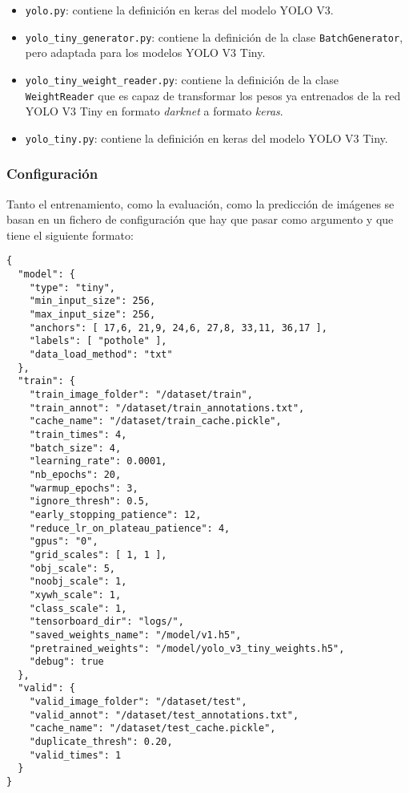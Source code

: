 \begin{itemize}
	\item \texttt{yolo.py}:  contiene la definición en keras del modelo YOLO V3.
	\item \texttt{yolo\_tiny\_generator.py}: contiene la definición de la clase \texttt{BatchGenerator}, pero adaptada para los modelos YOLO V3 Tiny.
	\item \texttt{yolo\_tiny\_weight\_reader.py}: contiene la definición de la clase \texttt{WeightReader}  que es capaz de transformar los pesos ya entrenados de la red YOLO V3 Tiny en formato \textit{darknet} a formato \textit{keras}.
	\item \texttt{yolo\_tiny.py}: contiene la definición en keras del modelo YOLO V3 Tiny.
\end{itemize}

\subsubsection*{Configuración}

Tanto el entrenamiento, como la evaluación, como la predicción de imágenes se basan en un fichero de configuración que hay que pasar como argumento y que tiene el siguiente formato:

\begin{lstlisting}[frame=single, basicstyle=\ttfamily\footnotesize, caption={Configuración de ejemplo}, captionpos=b]
{
  "model": {
    "type": "tiny",
    "min_input_size": 256,
    "max_input_size": 256,
    "anchors": [ 17,6, 21,9, 24,6, 27,8, 33,11, 36,17 ],
    "labels": [ "pothole" ],
    "data_load_method": "txt"
  },
  "train": {
    "train_image_folder": "/dataset/train",
    "train_annot": "/dataset/train_annotations.txt",
    "cache_name": "/dataset/train_cache.pickle",
    "train_times": 4,
    "batch_size": 4,
    "learning_rate": 0.0001,
    "nb_epochs": 20,
    "warmup_epochs": 3,
    "ignore_thresh": 0.5,
    "early_stopping_patience": 12,
    "reduce_lr_on_plateau_patience": 4,
    "gpus": "0",
    "grid_scales": [ 1, 1 ],
    "obj_scale": 5,
    "noobj_scale": 1,
    "xywh_scale": 1,
    "class_scale": 1,
    "tensorboard_dir": "logs/",
    "saved_weights_name": "/model/v1.h5",
    "pretrained_weights": "/model/yolo_v3_tiny_weights.h5",
    "debug": true
  },
  "valid": {
    "valid_image_folder": "/dataset/test",
    "valid_annot": "/dataset/test_annotations.txt",
    "cache_name": "/dataset/test_cache.pickle",
    "duplicate_thresh": 0.20,
    "valid_times": 1
  }
}
\end{lstlisting}

